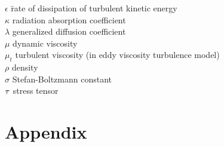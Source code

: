 \documentclass[graybox]{svmult}
\begin{document}
\begin{tabbing}
$\epsilon$ \hspace{1in}  \= rate of dissipation of turbulent kinetic energy \\
$\kappa$                 \> radiation absorption coefficient \\
$\lambda$                \> generalized diffusion coefficient \\
$\mu$                    \> dynamic viscosity \\
$\mu_t$                  \> turbulent viscosity (in eddy viscosity turbulence model) \\
$\rho$                   \> density \\
$\sigma$                 \> Stefan-Boltzmann constant \\
$\tens{\tau}$	         \> stress tensor
\end{tabbing}





\section*{Appendix}
\end{document}

